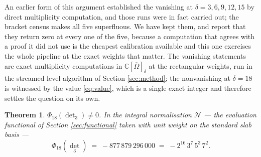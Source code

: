 \documentclass[11pt,reqno]{amsart}
\theoremstyle{plain}
\newtheorem{theorem}{Theorem}[section]
\theoremstyle{definition}
\newcommand{\cO}{\overline{\Omega}}
\newcommand{\bC}{\mathbb{C}}
\begin{document}
An earlier form of this argument established the vanishing at
$\delta=3,6,9,12,15$ by direct multiplicity computation, and those runs were in
fact carried out; the bracket census makes all five superfluous.  We have kept
them, and report that they return zero at every one of the five, because a
computation that agrees with a proof it did not use is the cheapest calibration
available and this one exercises the whole pipeline at the exact weights that
matter.  The vanishing statements are
exact multiplicity computations in
$\bC[\cO]_\delta$ at the rectangular weights, run in the streamed level
algorithm of Section \ref{sec:method}; the nonvanishing at $\delta=18$ is
witnessed by the value \eqref{eq:value}, which is a single exact integer and
therefore settles the question on its own.

\begin{theorem}\label{thm:value}
$\Phi_{18}(\det_3)\neq0$.  In the integral normalisation $\mathcal N$ --- the
evaluation functional of Section \ref{sec:functional} taken with unit weight on
the standard slab basis ---
\begin{equation}\label{eq:value}
  \Phi_{18}(\det_3)\;=\;-877\,879\,296\,000\;=\;-2^{16}\,3^{7}\,5^{3}\,7^{2} .
\end{equation}
\end{theorem}
\end{document}
